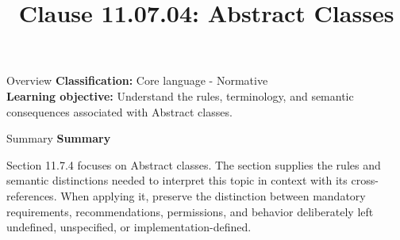 \documentclass[10pt,letterpaper]{article}
\title{Clause 11.07.04: Abstract Classes}
\author{}
\date{}
\begin{document}
\maketitle
\begin{CornellOverviewBox}{Overview}
\textbf{Classification:} Core language - Normative\\[2pt]
\textbf{Learning objective:} Understand the rules, terminology, and semantic consequences associated with Abstract classes.
\end{CornellOverviewBox}\begin{CornellSummaryBox}{Summary}
{\sffamily\bfseries\color{Accent} Summary}\par\vspace{3pt}Section 11.7.4 focuses on Abstract classes. The section supplies the rules and semantic distinctions needed to interpret this topic in context with its cross-references. When applying it, preserve the distinction between mandatory requirements, recommendations, permissions, and behavior deliberately left undefined, unspecified, or implementation-defined.
\end{CornellSummaryBox}
\end{document}
